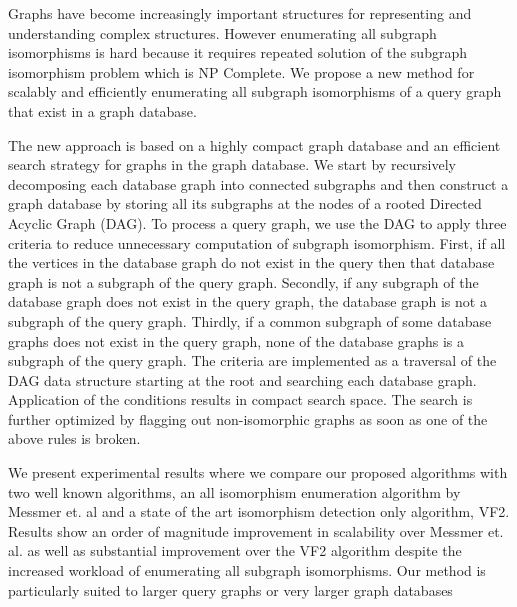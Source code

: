 
Graphs have become increasingly important structures for representing and understanding complex structures. However enumerating all subgraph isomorphisms is hard because it requires repeated solution of the subgraph isomorphism problem which is NP Complete.
We propose a new method for scalably and efficiently 
enumerating all subgraph isomorphisms of a query graph that exist in a graph database. 

The new approach is based on a highly compact graph database and an efficient search strategy for graphs in the graph database. We start by recursively decomposing each database graph into connected subgraphs and then construct a graph database by storing all its subgraphs at the nodes of a rooted Directed Acyclic Graph (DAG). To process a query graph, we use the DAG to apply three criteria to reduce unnecessary computation of subgraph isomorphism. First, if all the vertices in the database graph do not exist in the query then that database graph is not a subgraph of the query graph. Secondly, if any subgraph of the database graph does not exist in the query graph, the database graph is not a subgraph of the query graph. Thirdly, if a common subgraph of some database graphs does not exist in the query graph, none of the database graphs is a subgraph of the query graph. The criteria are implemented as a traversal of the DAG data structure starting at the root and searching each database graph. Application of the conditions results in compact search space. The search is further optimized by flagging out non-isomorphic graphs as soon as one of the above rules is broken. 

We present experimental results where we compare our proposed algorithms with two well known algorithms, an all isomorphism enumeration algorithm by Messmer et. al and a state of the art isomorphism detection only algorithm, VF2. Results show an order of magnitude improvement in scalability over Messmer et. al. as well as substantial improvement over the VF2 algorithm despite the increased workload of enumerating all subgraph isomorphisms. Our method is particularly suited to larger query graphs or very larger graph databases
